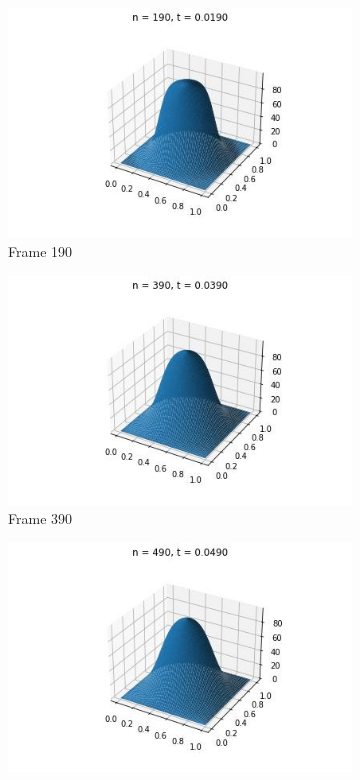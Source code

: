 \documentclass{article}
\begin{document}
\begin{figure} [H]
\begin{subfigure}{0.3\linewidth}
    \includegraphics[width=\linewidth]{Polar/3D/190.jpg}
    \caption{Frame 190}
  \end{subfigure}
  \begin{subfigure}{0.3\linewidth}
    \centering
    \includegraphics[width=\linewidth]{Polar/3D/390.jpg}
    \caption{Frame 390}
  \end{subfigure}
    \begin{subfigure}{0.3\linewidth}
    \centering
    \includegraphics[width=\linewidth]{Polar/3D/490.jpg}

\end{subfigure}
\end{figure}
\end{document}
